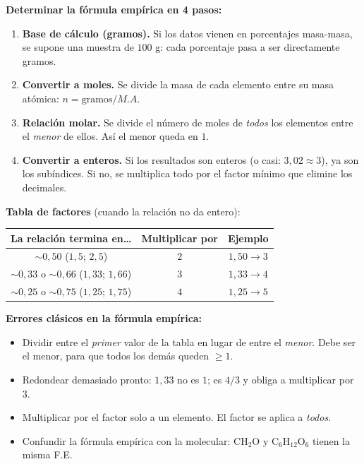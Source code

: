 \documentclass[12pt, letterpaper]{article}
\begin{document}
\begin{cuadropasos}
  \textbf{Determinar la fórmula empírica en 4 pasos:}
  \begin{enumerate}[leftmargin=*]
    \item \textbf{Base de cálculo (gramos).} Si los datos vienen en porcentajes masa-masa, se supone una muestra de $100$ g: cada porcentaje pasa a ser directamente gramos.
    \item \textbf{Convertir a moles.} Se divide la masa de cada elemento entre su masa atómica:
          $n = \text{gramos}/M.A.$
    \item \textbf{Relación molar.} Se divide el número de moles de \emph{todos} los elementos entre el \emph{menor} de ellos. Así el menor queda en $1$.
    \item \textbf{Convertir a enteros.} Si los resultados son enteros (o casi: $3{,}02 \approx 3$), ya son los subíndices. Si no, se multiplica todo por el factor mínimo que elimine los decimales.
  \end{enumerate}
\end{cuadropasos}

\begin{cuadroextra}
  \textbf{Tabla de factores} (cuando la relación no da entero):
  \begin{center}
    \small
    \begin{tabular}{ccc}
      \toprule
      La relación termina en\ldots & Multiplicar por & Ejemplo \\
      \midrule
      $\sim 0{,}50$ ($1{,}5$; $2{,}5$)      & $2$ & $1{,}50 \to 3$ \\
      $\sim 0{,}33$ o $\sim 0{,}66$ ($1{,}33$; $1{,}66$) & $3$ & $1{,}33 \to 4$ \\
      $\sim 0{,}25$ o $\sim 0{,}75$ ($1{,}25$; $1{,}75$) & $4$ & $1{,}25 \to 5$ \\
      \bottomrule
    \end{tabular}
  \end{center}
\end{cuadroextra}

\begin{cuadroadvertencia}
  \textbf{Errores clásicos en la fórmula empírica:}
  \begin{itemize}[leftmargin=*]
    \item Dividir entre el \emph{primer} valor de la tabla en lugar de entre el \emph{menor}. Debe ser el menor, para que todos los demás queden $\geq 1$.
    \item Redondear demasiado pronto: $1{,}33$ no es $1$; es $4/3$ y obliga a multiplicar por $3$.
    \item Multiplicar por el factor solo a un elemento. El factor se aplica a \emph{todos}.
    \item Confundir la fórmula empírica con la molecular: $\text{CH}_2\text{O}$ y $\text{C}_6\text{H}_{12}\text{O}_6$ tienen la misma F.E.
  \end{itemize}
\end{cuadroadvertencia}
\end{document}
